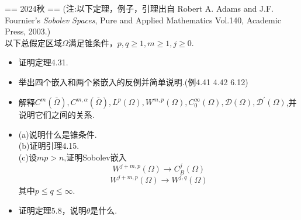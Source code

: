 

== 2024秋 ==
(注:以下定理，例子，引理出自 
Robert A. Adams and J.F. Fournier's \textit{Sobolev Spaces}, 
Pure and Applied Mathematics Vol.140, Academic Press, 2003.)\\
以下总假定区域$\Omega$满足锥条件，$p,q\geq 1,m\geq 1,j\geq 0$.
\begin{itemize}
\item[一]证明定理4.31.
\item[二]举出四个嵌入和两个紧嵌入的反例并简单说明.(例4.41 4.42 6.12)
\item[三]解释$C^{m}(\overline\Omega),C^{m,\alpha}(\overline\Omega),L^p(\Omega),W^{m,p}(\Omega),C^\infty_0(\Omega),\mathcal{D}(\Omega),\mathcal{D}^\prime(\Omega)$,并说明它们之间的关系.
\item[四]
    (a)说明什么是锥条件.\\
    (b)证明引理4.15.\\
    (c)设$mp>n$,证明Sobolev嵌入
    \[ W^{j+m,p}(\Omega)\rightarrow C^j_B(\Omega)\]
    \[ W^{j+m,p}(\Omega)\rightarrow W^{j,q}(\Omega)\]
   其中$p\leq q \leq \infty$.
\item[五]
证明定理5.8，说明$\theta$是什么.
   
\end{itemize}